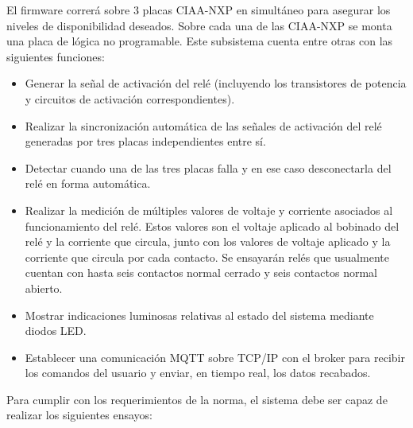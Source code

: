 \documentclass[11pt]{charter}
\begin{document}
\vspace{25px}

El firmware correrá sobre 3 placas CIAA-NXP en simultáneo para asegurar los niveles de disponibilidad deseados. Sobre cada una de las CIAA-NXP se monta una placa de lógica no programable. Este subsistema cuenta entre otras con las siguientes funciones:

\begin{itemize}
\item Generar la señal de activación del relé (incluyendo los transistores de potencia y circuitos de activación correspondientes).
\item Realizar la sincronización automática de las señales de activación del relé generadas por tres placas independientes entre sí.
\item Detectar cuando una de las tres placas falla y en ese caso desconectarla del relé en forma automática.
\item Realizar la medición de múltiples valores de voltaje y corriente asociados al funcionamiento del relé. Estos valores son el voltaje aplicado al bobinado del relé y la corriente que circula, junto con los valores de voltaje aplicado y la corriente que circula por cada contacto. Se ensayarán relés que usualmente cuentan con hasta seis contactos normal cerrado y seis contactos normal abierto.
\item Mostrar indicaciones luminosas relativas al estado del sistema mediante diodos LED.
\item Establecer una comunicación MQTT sobre TCP/IP con el broker para recibir los comandos del usuario y enviar, en tiempo real, los datos recabados.
\end{itemize}

Para cumplir con los requerimientos de la norma, el sistema debe ser capaz de realizar los siguientes ensayos:
\end{document}
